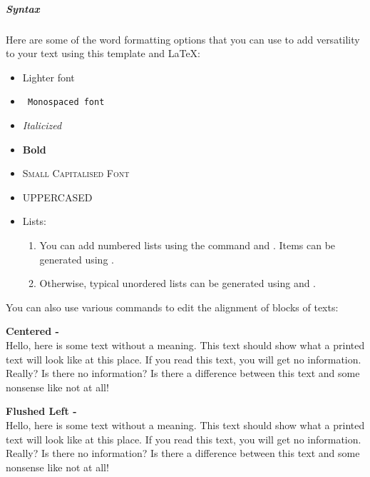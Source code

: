 \documentclass[a4paper]{qgabe-worksheet}
\begin{document}
\subparagraph{Syntax} Here are some of the word formatting options that you can use to add versatility to your text using this template and LaTeX: \\
\begin{itemize}
	\item\textsf{ Lighter font}
	\item\texttt{ Monospaced font}
	\item\textit{ Italicized}
	\item\textbf{ Bold}
	\item\textsc{ Small Capitalised Font}
	\item\uppercase{ Uppercased}
	\item Lists:
	\begin{enumerate}
		\item You can add numbered lists using the command  and . Items can be generated using .
		\item Otherwise, typical unordered lists can be generated using  and .
	\end{enumerate}
\end {itemize}

You can also use various commands to edit the alignment of blocks of texts:
\linebreak %

\centering
\textbf{Centered -  }\\
Hello, here is some text without a meaning. This text should show what a printed text will look like at this place. If you read this text, you will get no information. Really? Is there no information? Is there a difference between this text and some nonsense like not at all!
\linebreak

\flushleft
\textbf{Flushed Left -  }\\
Hello, here is some text without a meaning. This text should show what a printed text will look like at this place. If you read this text, you will get no information. Really? Is there no information? Is there a difference between this text and some nonsense like not at all!
\linebreak
\end{document}

